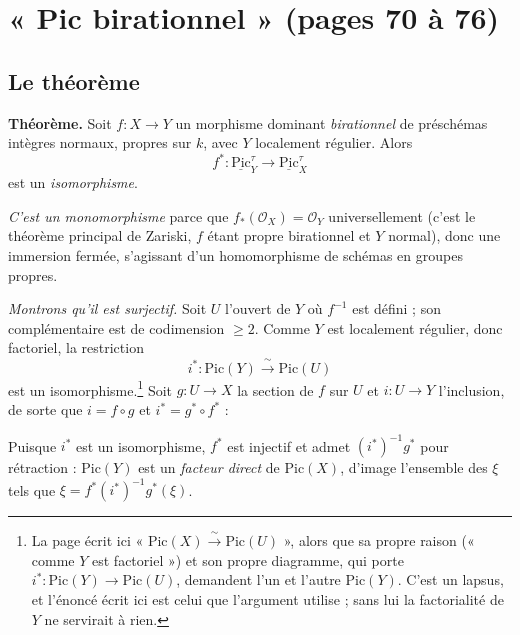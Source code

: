 \documentclass[11pt,a4paper]{article}
\begin{document}
\section*{« Pic birationnel » (pages 70 à 76)}

\subsection*{Le théorème}

\textbf{Théorème.} Soit $f : X \to Y$ un morphisme dominant \emph{birationnel}
de préschémas intègres normaux, propres sur $k$, avec $Y$ localement régulier.
Alors
\[
  f^{*} : \underline{\mathrm{Pic}}^{\tau}_{Y} \longrightarrow
  \underline{\mathrm{Pic}}^{\tau}_{X}
\]
est un \emph{isomorphisme}.

\emph{C'est un monomorphisme} parce que $f_{*}(\mathcal{O}_{X}) =
\mathcal{O}_{Y}$ universellement (c'est le théorème principal de
Zariski, $f$ étant propre birationnel et $Y$ normal), donc une immersion
fermée, s'agissant d'un homomorphisme de schémas en groupes propres.

\emph{Montrons qu'il est surjectif.} Soit $U$ l'ouvert de $Y$ où $f^{-1}$ est
défini ; son complémentaire est de codimension $\geqslant 2$. Comme $Y$ est
localement régulier, donc factoriel, la restriction
\[
  i^{*} : \mathrm{Pic}(Y) \xrightarrow{\ \sim\ } \mathrm{Pic}(U)
\]
est un isomorphisme.\footnote{La page écrit ici
« $\mathrm{Pic}(X) \xrightarrow{\ \sim\ } \mathrm{Pic}(U)$ », alors que sa
propre raison (« comme $Y$ est factoriel ») et son propre diagramme,
qui porte $i^{*} : \mathrm{Pic}(Y) \to \mathrm{Pic}(U)$, demandent l'un et
l'autre $\mathrm{Pic}(Y)$. C'est un lapsus, et l'énoncé écrit ici est celui que
l'argument utilise ; sans lui la factorialité de $Y$ ne servirait à rien.}
Soit $g : U \to X$ la section de $f$ sur $U$ et $i : U \to Y$ l'inclusion, de
sorte que $i = f \circ g$ et $i^{*} = g^{*} \circ f^{*}$ :



Puisque $i^{*}$ est un isomorphisme, $f^{*}$ est injectif et admet
$(i^{*})^{-1} g^{*}$ pour rétraction : $\mathrm{Pic}(Y)$ est un
\emph{facteur direct} de $\mathrm{Pic}(X)$, d'image l'ensemble des $\xi$ tels
que $\xi = f^{*}(i^{*})^{-1}g^{*}(\xi)$.
\end{document}

